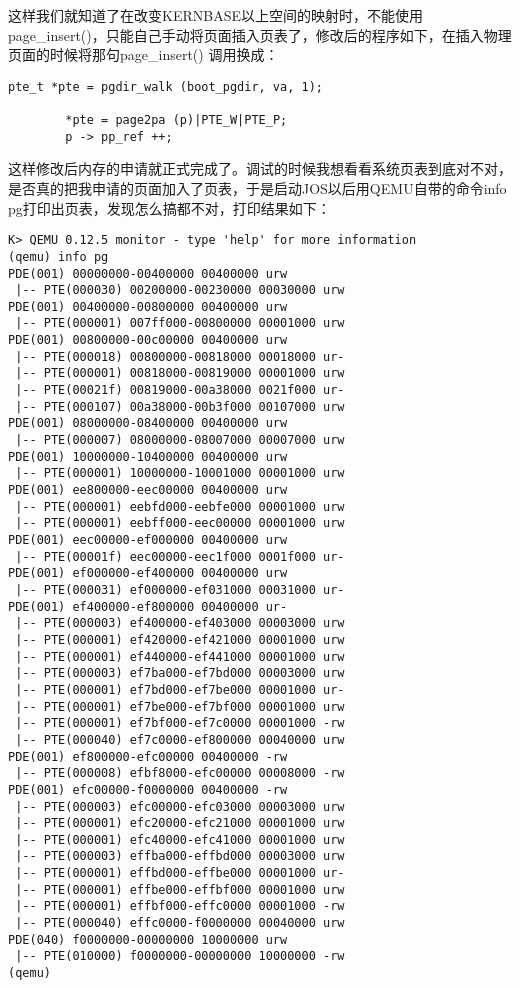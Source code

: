 \documentclass{article}
\newcommand{\funcname}[1]{{\ttfamily \small #1}}
\begin{document}
\begin{CJK*}{UTF8}{gkai}
这样我们就知道了在改变KERNBASE以上空间的映射时，不能使用 \funcname{page\_insert()}，只能自己手动将页面插入页表了，修改后的程序如下，在插入物理页面的时候将那句\funcname{page\_insert()} 调用换成：

\begin{lstlisting}[style=ccode]
        pte_t *pte = pgdir_walk (boot_pgdir, va, 1);

        *pte = page2pa (p)|PTE_W|PTE_P;
        p -> pp_ref ++;
\end{lstlisting}

这样修改后内存的申请就正式完成了。调试的时候我想看看系统页表到底对不对，是否真的把我申请的页面加入了页表，于是启动JOS以后用QEMU自带的命令info pg打印出页表，发现怎么搞都不对，打印结果如下：

\begin{lstlisting}[style=console]
K> QEMU 0.12.5 monitor - type 'help' for more information
(qemu) info pg
PDE(001) 00000000-00400000 00400000 urw
 |-- PTE(000030) 00200000-00230000 00030000 urw
PDE(001) 00400000-00800000 00400000 urw
 |-- PTE(000001) 007ff000-00800000 00001000 urw
PDE(001) 00800000-00c00000 00400000 urw
 |-- PTE(000018) 00800000-00818000 00018000 ur-
 |-- PTE(000001) 00818000-00819000 00001000 urw
 |-- PTE(00021f) 00819000-00a38000 0021f000 ur-
 |-- PTE(000107) 00a38000-00b3f000 00107000 urw
PDE(001) 08000000-08400000 00400000 urw
 |-- PTE(000007) 08000000-08007000 00007000 urw
PDE(001) 10000000-10400000 00400000 urw
 |-- PTE(000001) 10000000-10001000 00001000 urw
PDE(001) ee800000-eec00000 00400000 urw
 |-- PTE(000001) eebfd000-eebfe000 00001000 urw
 |-- PTE(000001) eebff000-eec00000 00001000 urw
PDE(001) eec00000-ef000000 00400000 urw
 |-- PTE(00001f) eec00000-eec1f000 0001f000 ur-
PDE(001) ef000000-ef400000 00400000 urw
 |-- PTE(000031) ef000000-ef031000 00031000 ur-
PDE(001) ef400000-ef800000 00400000 ur-
 |-- PTE(000003) ef400000-ef403000 00003000 urw
 |-- PTE(000001) ef420000-ef421000 00001000 urw
 |-- PTE(000001) ef440000-ef441000 00001000 urw
 |-- PTE(000003) ef7ba000-ef7bd000 00003000 urw
 |-- PTE(000001) ef7bd000-ef7be000 00001000 ur-
 |-- PTE(000001) ef7be000-ef7bf000 00001000 urw
 |-- PTE(000001) ef7bf000-ef7c0000 00001000 -rw
 |-- PTE(000040) ef7c0000-ef800000 00040000 urw
PDE(001) ef800000-efc00000 00400000 -rw
 |-- PTE(000008) efbf8000-efc00000 00008000 -rw
PDE(001) efc00000-f0000000 00400000 -rw
 |-- PTE(000003) efc00000-efc03000 00003000 urw
 |-- PTE(000001) efc20000-efc21000 00001000 urw
 |-- PTE(000001) efc40000-efc41000 00001000 urw
 |-- PTE(000003) effba000-effbd000 00003000 urw
 |-- PTE(000001) effbd000-effbe000 00001000 ur-
 |-- PTE(000001) effbe000-effbf000 00001000 urw
 |-- PTE(000001) effbf000-effc0000 00001000 -rw
 |-- PTE(000040) effc0000-f0000000 00040000 urw
PDE(040) f0000000-00000000 10000000 urw
 |-- PTE(010000) f0000000-00000000 10000000 -rw
(qemu) 
\end{lstlisting}


\end{CJK*}
\end{document}
